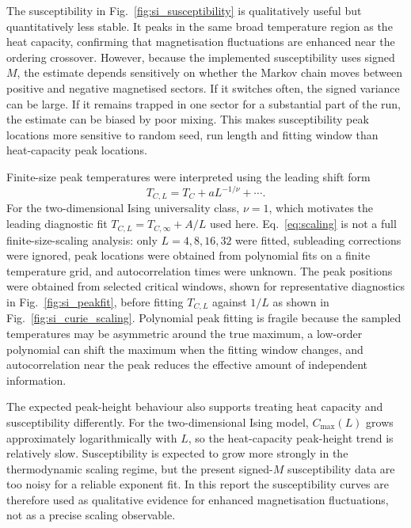 \documentclass[twoside,twocolumn,9pt]{extarticle}
\begin{document}
The susceptibility in Fig.~\ref{fig:si_susceptibility} is qualitatively useful but quantitatively less stable. It peaks in the same broad temperature region as the heat capacity, confirming that magnetisation fluctuations are enhanced near the ordering crossover. However, because the implemented susceptibility uses signed \(M\), the estimate depends sensitively on whether the Markov chain moves between positive and negative magnetised sectors. If it switches often, the signed variance can be large. If it remains trapped in one sector for a substantial part of the run, the estimate can be biased by poor mixing. This makes susceptibility peak locations more sensitive to random seed, run length and fitting window than heat-capacity peak locations.

Finite-size peak temperatures were interpreted using the leading shift form
\begin{equation}
  T_{C,L}=T_C+aL^{-1/\nu}+\cdots .
  \label{eq:scaling}
\end{equation}
For the two-dimensional Ising universality class, \(\nu=1\), which motivates the leading diagnostic fit \(T_{C,L}=T_{C,\infty}+A/L\) used here.\cite{fisher1972,binder1981} Eq.~\eqref{eq:scaling} is not a full finite-size-scaling analysis: only \(L=4,8,16,32\) were fitted, subleading corrections were ignored, peak locations were obtained from polynomial fits on a finite temperature grid, and autocorrelation times were unknown. The peak positions were obtained from selected critical windows, shown for representative diagnostics in Fig.~\ref{fig:si_peakfit}, before fitting \(T_{C,L}\) against \(1/L\) as shown in Fig.~\ref{fig:si_curie_scaling}. Polynomial peak fitting is fragile because the sampled temperatures may be asymmetric around the true maximum, a low-order polynomial can shift the maximum when the fitting window changes, and autocorrelation near the peak reduces the effective amount of independent information.

The expected peak-height behaviour also supports treating heat capacity and susceptibility differently. For the two-dimensional Ising model, \(C_{\max}(L)\) grows approximately logarithmically with \(L\), so the heat-capacity peak-height trend is relatively slow.\cite{ferdinand1969} Susceptibility is expected to grow more strongly in the thermodynamic scaling regime, but the present signed-\(M\) susceptibility data are too noisy for a reliable exponent fit. In this report the susceptibility curves are therefore used as qualitative evidence for enhanced magnetisation fluctuations, not as a precise scaling observable.
\end{document}
